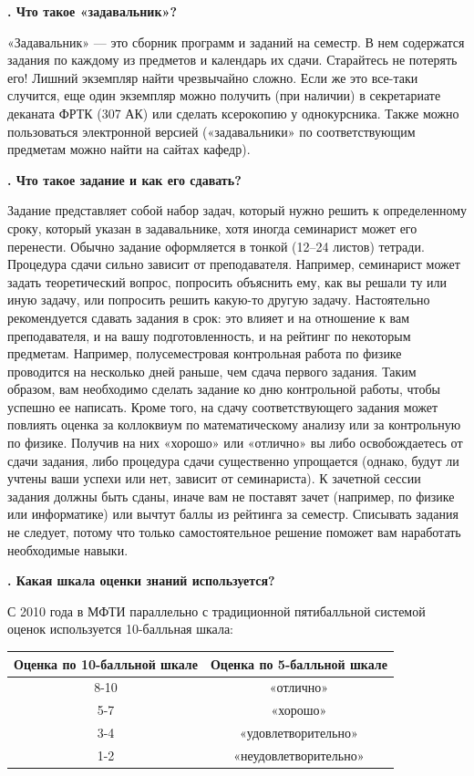 \documentclass[14pt]{extarticle}
\newcounter{question}
\newcommand\Que[1]{%
    \begin{minipage}{\textwidth}
    \leavevmode\par
    \stepcounter{question}
    \noindent
    {\large\textbf{\thequestion. #1}}\par}
\newcommand\Ans[2][]{%
    \leavevmode\par\noindent
    {\leftskip37pt
    \textbf{#1}#2\par}
    \end{minipage}}
\newcommand\Partans[2][]{%
    \leavevmode\par\noindent
    {\leftskip37pt
    \textbf{#1}#2\par}}
\begin{document}
\Que{Что такое «задавальник»?}
\Ans{«Задавальник» — это сборник программ и заданий на семестр. В нем содержатся задания по каждому из предметов и календарь их сдачи. Старайтесь не потерять его! Лишний экземпляр найти чрезвычайно сложно. Если же это все-таки случится, еще один экземпляр можно получить (при наличии) в секретариате деканата ФРТК (307 АК) или сделать ксерокопию у однокурсника. Также можно пользоваться электронной версией («задавальники» по соответствующим предметам можно найти на сайтах кафедр).}

\Que{Что такое задание и как его сдавать?}
\Ans{Задание представляет собой набор задач, который нужно решить к определенному сроку, который указан в задавальнике, хотя иногда семинарист может его перенести. Обычно задание оформляется в тонкой (12–24 листов) тетради. Процедура сдачи сильно зависит от преподавателя. Например, семинарист может задать теоретический вопрос, попросить объяснить ему, как вы решали ту или иную задачу, или попросить решить какую-то другую задачу. Настоятельно рекомендуется сдавать задания в срок: это влияет и на отношение к вам преподавателя, и на вашу подготовленность, и на рейтинг по некоторым предметам. Например, полусеместровая контрольная работа по физике проводится на несколько дней раньше, чем сдача первого задания. Таким образом, вам необходимо сделать задание ко дню контрольной работы, чтобы успешно ее написать. Кроме того, на сдачу соответствующего задания может повлиять оценка за коллоквиум по математическому анализу или за контрольную по физике. Получив на них «хорошо» или «отлично» вы либо освобождаетесь от сдачи задания, либо процедура сдачи существенно упрощается (однако, будут ли учтены ваши успехи или нет, зависит от семинариста). К зачетной сессии задания должны быть сданы, иначе вам не поставят зачет (например, по физике или информатике) или вычтут баллы из рейтинга за семестр. Списывать задания не следует, потому что только самостоятельное решение поможет вам наработать необходимые навыки.}

\Que{Какая шкала оценки знаний используется?}
\Partans{С 2010 года в МФТИ параллельно с традиционной пятибалльной системой оценок используется 10-балльная шкала:}
\begin{center}
\begin{tabular}{ |c|c| }
\hline
    \textbf{Оценка по 10-балльной шкале} & \textbf{Оценка по 5-балльной шкале} \\ \hline
    8-10 & «отлично» \\ \hline
    5-7 & «хорошо» \\ \hline
    3-4 & «удовлетворительно» \\ \hline
    1-2 & «неудовлетворительно» \\
\hline
\end{tabular}
\end{center}
\end{minipage}
\end{document}
